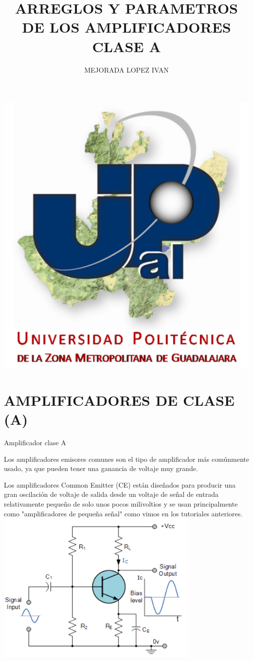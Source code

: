 \documentclass[12pt,a4paper]{article}
\author{MEJORADA LOPEZ IVAN}
\title{ARREGLOS Y PARAMETROS DE LOS AMPLIFICADORES CLASE A}
\begin{document}
\maketitle
\includegraphics[width=17.5cm]{UPZMG_Prueba_1b.png} 
\newpage
\section{AMPLIFICADORES DE CLASE (A)}
Amplificador clase A

Los amplificadores emisores comunes son el tipo de amplificador m\'as com\'unmente usado, ya que pueden tener una ganancia de voltaje muy grande.

Los amplificadores Common Emitter (CE) est\'an dise\~nados para producir una gran oscilaci\'on de voltaje de salida desde un voltaje de se\~nal de entrada relativamente peque\~no de solo unos pocos milivoltios y se usan principalmente como "amplificadores de peque\~na se\~nal" como vimos en los tutoriales anteriores.
\\
\includegraphics[width=10cm]{Amplificador clase A.jpg} 
\end{document}
